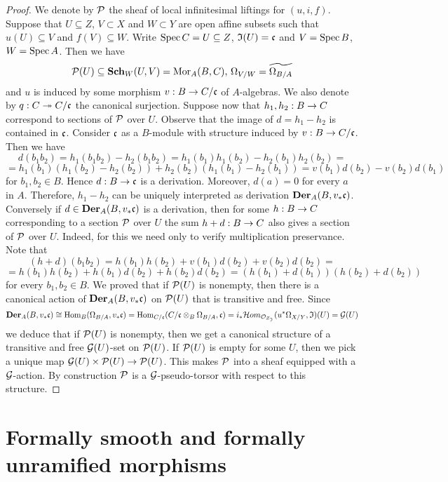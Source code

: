 \begin{proof}
We denote by ${\mathcal P}$ the sheaf of local infinitesimal liftings for $(u,i,f)$. Suppose that $U\subseteq Z$, $V\subset X$ and $W\subset Y$  are open affine subsets such that $u(U)\subseteq V$ and $f(V)\subseteq W$. Write $\mathrm{Spec}\, C = U\subseteq Z$, $\mathfrak{I}(U)=\mathfrak{c}$ and $V = \mathrm{Spec}\, B$, $W = \mathrm{Spec}\, A$. Then we have
$${\mathcal P}(U)\subseteq \mathbf{Sch}_W(U,V) = \mathrm{Mor}_A(B,C),\,\Omega_{V/W}=\widetilde{\Omega_{B/A}}$$
and $u$ is induced by some morphism $v:B\rightarrow C/\mathfrak{c}$ of $A$-algebras. We also denote by $q:C\twoheadrightarrow C/\mathfrak{c}$ the canonical surjection. Suppose now that $h_1,h_2:B\rightarrow C$ correspond to sections of ${\mathcal P}$ over $U$. Observe that the image of $d=h_1-h_2$ is contained in $\mathfrak{c}$. Consider $\mathfrak{c}$ as a $B$-module with structure induced by $v:B\rightarrow C/\mathfrak{c}$. Then we have
$$d(b_1b_2) = h_1(b_1b_2)-h_2(b_1b_2) = h_1(b_1)h_1(b_2)-h_2(b_1)h_2(b_2) =$$
$$= h_1(b_1)(h_1(b_2)-h_2(b_2))+h_2(b_2)(h_1(b_1)-h_2(b_1))=v(b_1)d(b_2)-v(b_2)d(b_1)$$
for $b_1,b_2\in B$. Hence $d:B\rightarrow \mathfrak{c}$ is a derivation. Moreover, $d(a)=0$ for every $a$ in $A$. Therefore, $h_1-h_2$ can be uniquely interpreted as derivation $\mathbf{Der}_A(B,v_*\mathfrak{c})$. Conversely if $d\in \mathbf{Der}_A(B,v_*\mathfrak{c})$ is a derivation, then for some $h:B\rightarrow C$ corresponding to a section ${\mathcal P}$ over $U$ the sum $h+d:B\rightarrow C$ also gives a section of ${\mathcal P}$ over $U$. Indeed, for this we need only to verify multiplication preservance. Note that
$$(h+d)(b_1b_2)=h(b_1)h(b_2)+v(b_1)d(b_2)+v(b_2)d(b_2)=$$
$$= h(b_1)h(b_2)+h(b_1)d(b_2)+h(b_2)d(b_2)=(h(b_1)+d(b_1))(h(b_2)+d(b_2))$$
for every $b_1,b_2\in B$. We proved that if ${\mathcal P}(U)$ is nonempty, then there is a canonical action of $\mathbf{Der}_A(B,v_*\mathfrak{c})$ on ${\mathcal P}(U)$ that is transitive and free. Since $$\mathbf{Der}_A(B,v_*\mathfrak{c})\cong \mathrm{Hom}_B(\Omega_{B/A},v_*\mathfrak{c})=\mathrm{Hom}_{C/\mathfrak{c}}(C/\mathfrak{c}\otimes_B\Omega_{B/A},\mathfrak{c})= i_*{\mathcal H}om_{{\mathcal O}_{Z_{\mathfrak{I}}}}(u^*\Omega_{X/Y},\mathfrak{I})(U)={\mathcal G}(U)$$
we deduce that if ${\mathcal P}(U)$ is nonempty, then we get a canonical structure of a transitive and free ${\mathcal G}(U)$-set on ${\mathcal P}(U)$. If ${\mathcal P}(U)$ is empty for some $U$, then we pick a unique map ${\mathcal G}(U)\times {\mathcal P}(U)\rightarrow {\mathcal P}(U)$. This makes ${\mathcal P}$ into a sheaf equipped with a ${\mathcal G}$-action. By construction ${\mathcal P}$ is a ${\mathcal G}$-pseudo-torsor with respect to this structure.
\end{proof}

\section{Formally smooth and  formally unramified morphisms}

